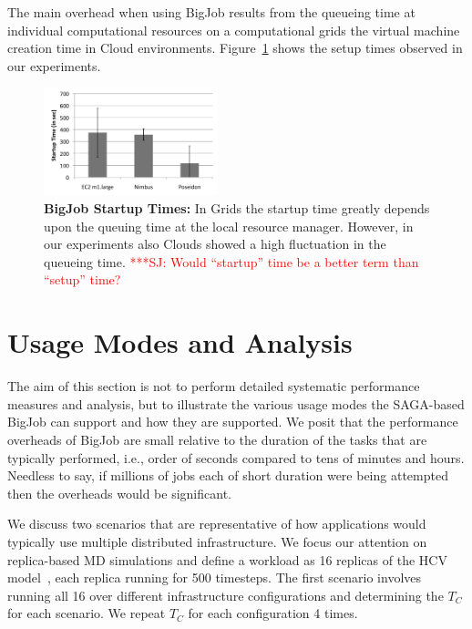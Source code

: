 \documentclass[conference,final]{IEEEtran}
\newcommand{\numrep}{16 }
\newcommand{\samplenum}{4 }
\newcommand{\tc}{$T_{C}$ }
\newcommand{\jhanote}[1]{ {\textcolor{red} { ***SJ: #1 }}}
\newcommand{\jhanote}[1]{}
\begin{document}
The main overhead when using BigJob results from the queueing time at
individual computational resources on a computational grids the
virtual machine creation time in Cloud
environments. Figure~\ref{fig:performance_setup_time} shows the setup
times observed in our experiments.
\begin{figure}[htbp]
    \centering
        \includegraphics[width=0.45\textwidth]{performance/setup_time_xls.pdf}
    \caption{\textbf{BigJob Startup Times:} In Grids the startup time
      greatly depends upon the queuing time at the local resource
      manager. However, in our experiments also Clouds showed a high
      fluctuation in the queueing time. \jhanote{Would ``startup''
        time be a better term than ``setup'' time?}}
    \label{fig:performance_setup_time}
\end{figure}


\section{Usage Modes and Analysis}

The aim of this section is not to perform detailed systematic
performance measures and analysis, but to illustrate the various usage
modes the SAGA-based BigJob can support and how they are supported. We
posit that the performance overheads of BigJob are small relative to
the duration of the tasks that are typically performed, i.e., order of
seconds compared to tens of minutes and hours.  Needless to say, if
millions of jobs each of short duration were being attempted then the
overheads would be significant.

We discuss two scenarios that are representative of how applications
would typically use multiple distributed infrastructure. We focus our
attention on replica-based MD simulations and define a workload as
\numrep replicas of the HCV model~\cite{}, each replica running for
500 timesteps.  The first scenario involves running all \numrep over
different infrastructure configurations and determining the \tc for
each scenario. We repeat \tc for each configuration \samplenum times.
\end{document}
